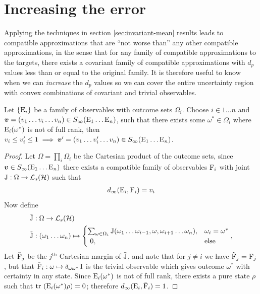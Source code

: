 \section{Increasing the error}
\label{sec:inc-error}
Applying the techniques in section \ref{sec:invariant-mean} results leads to compatible approximations that are ``not worse than'' any other compatible approximations, in the sense that for any family of compatible approximations to the targets, there exists a covariant family of compatible approximations with $d_p$ values less than or equal to the original family. It is therefore useful to know when we can \emph{increase} the $d_p$ values so we can cover the entire uncertainty region with convex combinations of covariant and trivial observables.

\begin{lem}
  \label{lem:infty-increase-error}
  Let $\{\operatorname{E}_i\}$ be a family of observables with outcome sets $\Omega_i$. Choose $i\in 1\hdots n$ and $\bm{v} = (v_1\hdots v_i\hdots v_n) \in S_\infty(\operatorname{E}_1\hdots\operatorname{E}_n)$, such that there exists some $\omega^*\in\Omega_i$ where $\operatorname{E}_i(\omega^*)$ is not of full rank, then $v_i \leq v_i^\prime \leq 1 \implies \bm{v}^\prime = (v_1\hdots v_i^\prime\hdots v_n) \in S_\infty(\operatorname{E}_1\hdots\operatorname{E}_n)$.
  \begin{proof}
    Let $\Omega = \prod_i \Omega_i$ be the Cartesian product of the outcome sets, since $\bm{v}\in S_\infty(\operatorname{E}_1\hdots\operatorname{E}_n)$ there exists a compatible family of observables $\operatorname{F}_i$ with joint $\opj:\Omega\to\saops[\hcal]$ such that
    \begin{align}
      d_\infty(\operatorname{E}_i, \operatorname{F}_i) = v_i
    \end{align}
    Now define
    \begin{align}
      \tilde{\opj}&:\Omega\to \saops[\hcal]\\
      \tilde{\opj}&:(\omega_1\hdots\omega_{n}) \mapsto \begin{cases}\sum_{\omega\in\Omega_i} \opj(\omega_1\hdots\omega_{i-1},\omega,\omega_{i+1}\hdots\omega_{n}), & \omega_i = \omega^*\\\ 0,&\text{else}\end{cases},
    \end{align}
    Let $\tilde{\operatorname{F}}_j$ be the $j^\text{th}$ Cartesian margin of $\tilde{\operatorname{J}}$, and note that for $j\neq i$ we have $\tilde{\operatorname{F}}_j = \operatorname{F}_j$, but that $\tilde{\operatorname{F}}_i:\omega\mapsto \delta_{\omega \omega^*}\operatorname{I}$ is the trivial observable which gives outcome $\omega^*$ with certainty in any state. Since $\operatorname{E}_i(\omega^*)$ is not of full rank, there exists a pure state $\rho$ such that $\tr{\ope_i(\omega^*)\rho} = 0$; therefore $d_\infty(\operatorname{E}_i, \tilde{\operatorname{F}}_i) = 1$.


\end{proof}
\end{lem}
